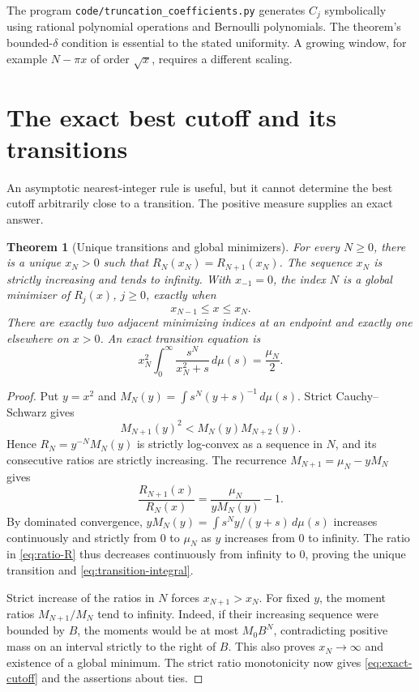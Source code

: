 \documentclass[11pt]{article}
\numberwithin{equation}{section}
\newtheorem{theorem}{Theorem}[section]
\theoremstyle{definition}
\theoremstyle{remark}
\begin{document}
The program \texttt{code/truncation\_coefficients.py} generates
$C_j$ symbolically using rational polynomial operations and
Bernoulli polynomials. The theorem's bounded-$\delta$ condition is
essential to the stated uniformity. A growing window, for example
$N-\pi x$ of order $\sqrt{x}$, requires a different scaling.

\section{The exact best cutoff and its transitions}
\label{sec:cutoff}

An asymptotic nearest-integer rule is useful, but it cannot determine
the best cutoff arbitrarily close to a transition. The positive
measure supplies an exact answer.

\begin{theorem}[Unique transitions and global minimizers]
\label{thm:transitions}
For every $N\ge0$, there is a unique $x_N>0$ such that
$R_N(x_N)=R_{N+1}(x_N)$. The sequence $x_N$ is strictly increasing
and tends to infinity. With $x_{-1}=0$, the index $N$ is a global
minimizer of $R_j(x)$, $j\ge0$, exactly when
\begin{equation}\label{eq:exact-cutoff}
 x_{N-1}\le x\le x_N.
\end{equation}
There are exactly two adjacent minimizing indices at an endpoint
and exactly one elsewhere on $x>0$. An exact transition equation is
\begin{equation}\label{eq:transition-integral}
 x_N^2\int_0^\infty\frac{s^N}{x_N^2+s}\,d\mu(s)=\frac{\mu_N}2.
\end{equation}
\end{theorem}
\begin{proof}
Put $y=x^2$ and
$M_N(y)=\int s^N(y+s)^{-1}\,d\mu(s)$.
Strict Cauchy--Schwarz gives
\[
 M_{N+1}(y)^2<M_N(y)M_{N+2}(y).
\]
Hence $R_N=y^{-N}M_N(y)$ is strictly log-convex as a sequence in
$N$, and its consecutive ratios are strictly increasing.
The recurrence $M_{N+1}=\mu_N-yM_N$ gives
\begin{equation}\label{eq:ratio-R}
 \frac{R_{N+1}(x)}{R_N(x)}
 =\frac{\mu_N}{yM_N(y)}-1.
\end{equation}
By dominated convergence,
$yM_N(y)=\int s^N y/(y+s)\,d\mu(s)$ increases continuously and
strictly from $0$ to $\mu_N$ as $y$ increases from $0$ to infinity.
The ratio in \eqref{eq:ratio-R} thus decreases continuously from
infinity to $0$, proving the unique transition and
\eqref{eq:transition-integral}.

Strict increase of the ratios in $N$ forces $x_{N+1}>x_N$.
For fixed $y$, the moment ratios $M_{N+1}/M_N$ tend to infinity.
Indeed, if their increasing sequence were bounded by $B$, the
moments would be at most $M_0B^N$, contradicting positive mass on
an interval strictly to the right of $B$. This also proves
$x_N\to\infty$ and existence of a global minimum. The strict ratio
monotonicity now gives \eqref{eq:exact-cutoff} and the assertions
about ties.
\end{proof}
\end{document}

